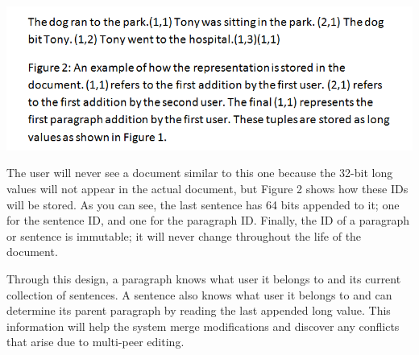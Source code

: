 \includegraphics[scale=0.55]{Figure2.png}

The user will never see a document similar to this one because the 32-bit long values will not appear in the actual document, but Figure 2 shows how these IDs will be stored. As you can see, the last sentence has 64 bits appended to it; one for the sentence ID, and one for the paragraph ID.  Finally, the ID of a paragraph or sentence is immutable; it will never change throughout the life of the document.

Through this design, a paragraph knows what user it belongs to and its current collection of sentences. A sentence also knows what user it belongs to and can determine its parent paragraph by reading the last appended long value. This information will help the system merge modifications and discover any conflicts that arise due to multi-peer editing.
